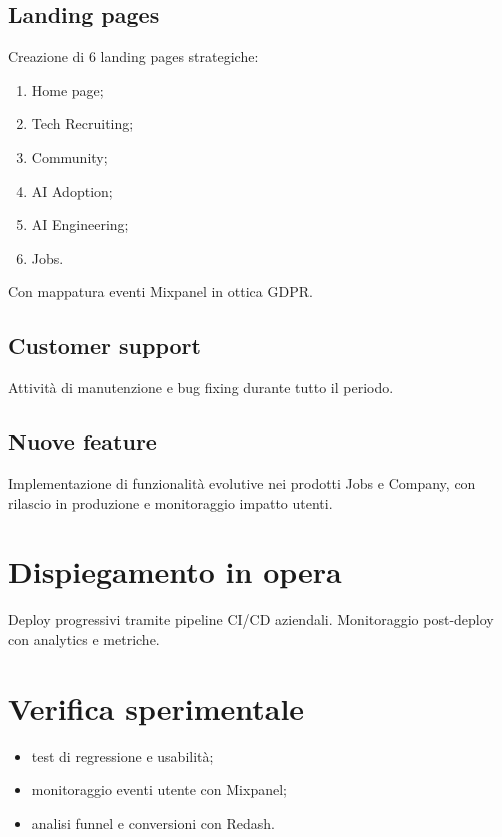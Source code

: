 \documentclass[12pt,a4paper,openright,twoside]{book}
\begin{document}
\section{Landing pages}
Creazione di 6 landing pages strategiche:
\begin{enumerate}
  \item Home page;
  \item Tech Recruiting;
  \item Community;
  \item AI Adoption;
  \item AI Engineering;
  \item Jobs.
\end{enumerate}
Con mappatura eventi Mixpanel in ottica GDPR.

\section{Customer support}
Attività di manutenzione e bug fixing durante tutto il periodo.

\section{Nuove feature}
Implementazione di funzionalità evolutive nei prodotti Jobs e Company, con rilascio in produzione e monitoraggio impatto utenti.

\chapter{Dispiegamento in opera}
Deploy progressivi tramite pipeline CI/CD aziendali. Monitoraggio post-deploy con analytics e metriche.

\chapter{Verifica sperimentale}
\begin{itemize}
  \item test di regressione e usabilità;
  \item monitoraggio eventi utente con Mixpanel;
  \item analisi funnel e conversioni con Redash.
\end{itemize}

\end{document}
